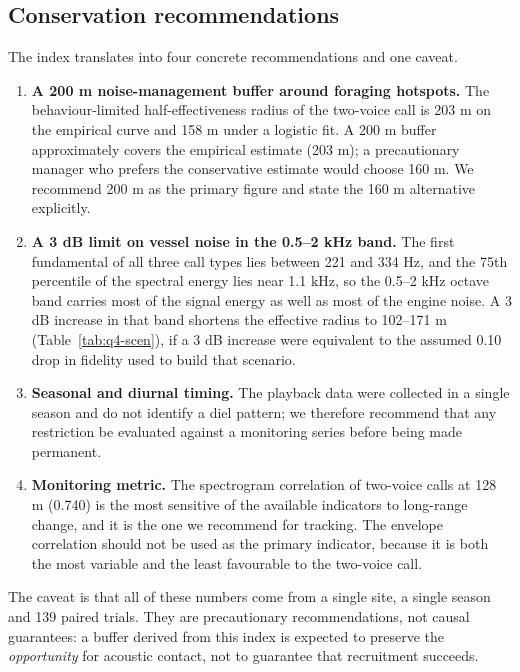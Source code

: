 \subsection{Conservation recommendations}\label{sec:q4-rec}

The index translates into four concrete recommendations and one caveat.

\begin{enumerate}[leftmargin=1.8em,itemsep=3pt]
  \item \textbf{A 200 m noise-management buffer around foraging hotspots.} The behaviour-limited
        half-effectiveness radius of the two-voice call is 203 m on the empirical curve and 158 m
        under a logistic fit. A 200 m buffer approximately covers the empirical estimate (203 m); a precautionary
        manager who prefers the conservative estimate would choose 160 m. We recommend 200 m as
        the primary figure and state the 160 m alternative explicitly.
  \item \textbf{A 3 dB limit on vessel noise in the 0.5--2 kHz band.} The first fundamental of
        all three call types lies between 221 and 334 Hz, and the 75th percentile of the spectral
        energy lies near 1.1 kHz, so the 0.5--2 kHz octave band carries most of the signal energy
        as well as most of the engine noise. A 3 dB increase in that band shortens the effective
        radius to 102--171 m (Table~\ref{tab:q4-scen}), if a 3 dB increase were equivalent to the
        assumed 0.10 drop in fidelity used to build that scenario.
  \item \textbf{Seasonal and diurnal timing.} The playback data were collected in a single season
        and do not identify a diel pattern; we therefore recommend that any restriction be
        evaluated against a monitoring series before being made permanent.
  \item \textbf{Monitoring metric.} The spectrogram correlation of two-voice calls at 128 m
        (0.740) is the most sensitive of the available indicators to long-range change, and it is
        the one we recommend for tracking. The envelope correlation should not be used as the
        primary indicator, because it is both the most variable and the least favourable to the
        two-voice call.
\end{enumerate}

The caveat is that all of these numbers come from a single site, a single season and 139 paired
trials. They are precautionary recommendations, not causal guarantees: a buffer derived from
this index is expected to preserve the \emph{opportunity} for acoustic contact, not to guarantee
that recruitment succeeds.

